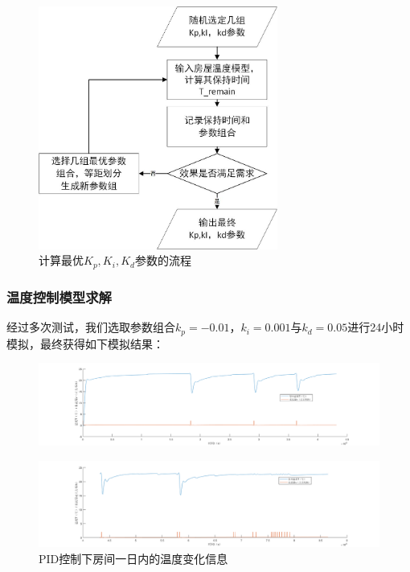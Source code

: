 \documentclass{my_paper}
\begin{document}
\begin {figure}[h]
\centering %
\includegraphics[width=0.7\textwidth]{liuc.jpg}
\caption{计算最优$K_p,K_i,K_d$参数的流程} %
\label{five}
\end {figure}

\subsubsection{温度控制模型求解}

经过多次测试，我们选取参数组合$k_p = -0.01$，$k_i= 0.001$与$k_d = 0.05$进行24小时模拟，最终获得如下模拟结果：

\begin {figure}[h]
\centering %
\includegraphics[width=\textwidth]{wd1.png}
\label{five}
\end {figure}
\begin {figure}[h]
\centering %
\includegraphics[width=\textwidth]{wd2.png}
\caption{PID控制下房间一日内的温度变化信息} %
\label{five}
\end {figure}
\end{document}
